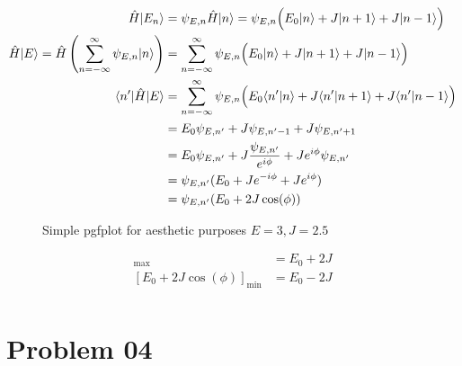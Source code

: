 \documentclass[letter]{article}
\begin{document}
\begin{align*}
	\hat{H} | E_n \rangle  &= \psi_{E,n} \hat{H}|  n \rangle = 
	\psi_{E,n} \Bigl(
E_0 | n \rangle  + J | n+1 \rangle + J| n-1 \rangle 
	\Bigr) \\ 
	\hat{H} | E \rangle  = \hat{H} \left( \sum_{n=-\infty}^{\infty} \psi_{E,n} | n \rangle \right) &= \sum_{n=-\infty}^{\infty} \psi_{E,n} \Bigl(
E_0 | n \rangle + J | n+1 \rangle + J | n-1 \rangle 
		\Bigr)  \\
		\langle n' | \hat{H} | E \rangle  &= 
		\sum_{n=-\infty}^{\infty} \psi_{E,n} 
		\Bigl(
E_0 \langle n' | n \rangle + J \langle n' | n+1 \rangle + J \langle n' | n-1 \rangle 
			\Bigr) \\ 
						  &= E_0 \psi_{E,n'}  + J \psi_{E,n' - 1} + J \psi_{E,n' + 1}  
					       \\ &= 
					        E_0 \psi_{E,n'} + J \frac{\psi_{E,n'}}{e^{i \phi}} + 
					        J e^{i \phi} \psi_{E,n'} \\ 
						  &= \psi_{E,n'} 
						  (E_0 + J e^{- i \phi} +  J e^{i \phi } )\\
						  &= \psi_{E,n'} (E_0 + 2  J \cos(\phi)) \\
\end{align*}
\begin{figure}[H]
	\centering
	\caption{Simple pgfplot for aesthetic purposes $E = 3, J = 2.5$}
	\label{}
\end{figure}
\begin{align*}
	[E_0 + 2  J\cos (\phi) ]_{\text{max}} &= E_0 + 2J \\
	[E_0 +2 J \cos (\phi)]_{\text{min}} &= E_0 - 2J  \\
\end{align*}



\section*{Problem 04} 
\end{document}
